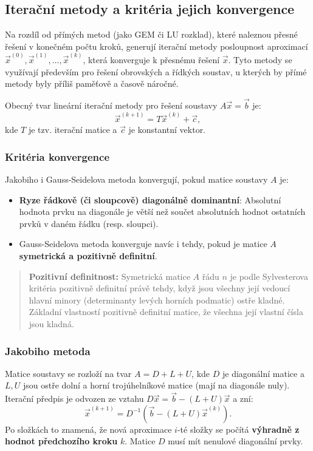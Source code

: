 \subsection{Iterační metody a kritéria jejich konvergence}

Na rozdíl od přímých metod (jako GEM či LU rozklad), které naleznou přesné řešení v konečném počtu kroků, generují iterační metody posloupnost aproximací $\vec{x}^{(0)}, \vec{x}^{(1)}, \dots, \vec{x}^{(k)}$, která konverguje k přesnému řešení $\vec{x}$. Tyto metody se využívají především pro řešení obrovských a řídkých soustav, u kterých by přímé metody byly příliš paměťově a časově náročné.

Obecný tvar lineární iterační metody pro řešení soustavy $A\vec{x} = \vec{b}$ je:
\[
\vec{x}^{(k+1)} = T\vec{x}^{(k)} + \vec{c},
\]
kde $T$ je tzv. iterační matice a $\vec{c}$ je konstantní vektor. 

\subsubsection{Kritéria konvergence}
Jakobiho i Gauss-Seidelova metoda konvergují, pokud matice soustavy $A$ je:
\begin{itemize}
    \item \textbf{Ryze řádkově (či sloupcově) diagonálně dominantní}: Absolutní hodnota prvku na diagonále je větší než součet absolutních hodnot ostatních prvků v daném řádku (resp. sloupci).
    \item Gauss-Seidelova metoda konverguje navíc i tehdy, pokud je matice $A$ \textbf{symetrická a pozitivně definitní}.
\end{itemize}
    \begin{quote}
        \textbf{Pozitivní definitnost:} 
        Symetrická matice $A$ řádu $n$ je podle Sylvesterova kritéria pozitivně definitní právě tehdy, když jsou všechny její vedoucí hlavní minory (determinanty levých horních podmatic) ostře kladné.
        Základní vlastností pozitivně definitní matice, že všechna její vlastní čísla jsou kladná.
    \end{quote}

\subsubsection{Jakobiho metoda}
Matice soustavy se rozloží na tvar $A = D + L + U$, kde $D$ je diagonální matice a $L, U$ jsou ostře dolní a horní trojúhelníkové matice (mají na diagonále nuly). Iterační předpis je odvozen ze vztahu $D\vec{x} = \vec{b} - (L+U)\vec{x}$ a zní:
\[
\vec{x}^{(k+1)} = D^{-1}(\vec{b} - (L+U)\vec{x}^{(k)}).
\]
Po složkách to znamená, že nová aproximace $i$-té složky se počítá \textbf{výhradně z hodnot předchozího kroku} $k$. Matice $D$ musí mít nenulové diagonální prvky.

